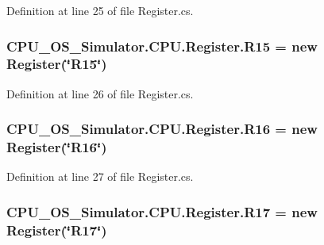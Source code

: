 Definition at line 25 of file Register.\+cs.

\hypertarget{class_c_p_u___o_s___simulator_1_1_c_p_u_1_1_register_a643aa109f6aea2e44a92aca9cd62b2df}{}
\subsubsection[{R15}]{ C\+P\+U\+\_\+\+O\+S\+\_\+\+Simulator.\+C\+P\+U.\+Register.\+R15 = new {\bf Register}(\char`\"{}R15\char`\"{})\hspace{0.3cm}{\ttfamily [static]}}\label{class_c_p_u___o_s___simulator_1_1_c_p_u_1_1_register_a643aa109f6aea2e44a92aca9cd62b2df}


Definition at line 26 of file Register.\+cs.

\hypertarget{class_c_p_u___o_s___simulator_1_1_c_p_u_1_1_register_ac008605898ab29a4ecd071f25f9e2d50}{}
\subsubsection[{R16}]{ C\+P\+U\+\_\+\+O\+S\+\_\+\+Simulator.\+C\+P\+U.\+Register.\+R16 = new {\bf Register}(\char`\"{}R16\char`\"{})\hspace{0.3cm}{\ttfamily [static]}}\label{class_c_p_u___o_s___simulator_1_1_c_p_u_1_1_register_ac008605898ab29a4ecd071f25f9e2d50}


Definition at line 27 of file Register.\+cs.

\hypertarget{class_c_p_u___o_s___simulator_1_1_c_p_u_1_1_register_add014a0021f9e8115728d7b95a398bda}{}
\subsubsection[{R17}]{ C\+P\+U\+\_\+\+O\+S\+\_\+\+Simulator.\+C\+P\+U.\+Register.\+R17 = new {\bf Register}(\char`\"{}R17\char`\"{})\hspace{0.3cm}{\ttfamily [static]}}\label{class_c_p_u___o_s___simulator_1_1_c_p_u_1_1_register_add014a0021f9e8115728d7b95a398bda}


